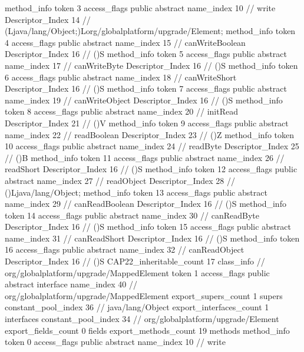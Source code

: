 {{{{{				}
				method_info {
					token	3
					access_flags	public abstract
					name_index	10		// write
					Descriptor_Index	14		// (Ljava/lang/Object;)Lorg/globalplatform/upgrade/Element;
				}
				method_info {
					token	4
					access_flags	public abstract
					name_index	15		// canWriteBoolean
					Descriptor_Index	16		// ()S
				}
				method_info {
					token	5
					access_flags	public abstract
					name_index	17		// canWriteByte
					Descriptor_Index	16		// ()S
				}
				method_info {
					token	6
					access_flags	public abstract
					name_index	18		// canWriteShort
					Descriptor_Index	16		// ()S
				}
				method_info {
					token	7
					access_flags	public abstract
					name_index	19		// canWriteObject
					Descriptor_Index	16		// ()S
				}
				method_info {
					token	8
					access_flags	public abstract
					name_index	20		// initRead
					Descriptor_Index	21		// ()V
				}
				method_info {
					token	9
					access_flags	public abstract
					name_index	22		// readBoolean
					Descriptor_Index	23		// ()Z
				}
				method_info {
					token	10
					access_flags	public abstract
					name_index	24		// readByte
					Descriptor_Index	25		// ()B
				}
				method_info {
					token	11
					access_flags	public abstract
					name_index	26		// readShort
					Descriptor_Index	16		// ()S
				}
				method_info {
					token	12
					access_flags	public abstract
					name_index	27		// readObject
					Descriptor_Index	28		// ()Ljava/lang/Object;
				}
				method_info {
					token	13
					access_flags	public abstract
					name_index	29		// canReadBoolean
					Descriptor_Index	16		// ()S
				}
				method_info {
					token	14
					access_flags	public abstract
					name_index	30		// canReadByte
					Descriptor_Index	16		// ()S
				}
				method_info {
					token	15
					access_flags	public abstract
					name_index	31		// canReadShort
					Descriptor_Index	16		// ()S
				}
				method_info {
					token	16
					access_flags	public abstract
					name_index	32		// canReadObject
					Descriptor_Index	16		// ()S
				}
			}
			CAP22_inheritable_count	17
		}
		class_info {		// org/globalplatform/upgrade/MappedElement
			token	1
			access_flags	public abstract interface
			name_index	40		// org/globalplatform/upgrade/MappedElement
			export_supers_count	1
			supers {
				constant_pool_index	36		// java/lang/Object
			}
			export_interfaces_count	1
			interfaces {
				constant_pool_index	34		// org/globalplatform/upgrade/Element
			}
			export_fields_count	0
			fields {
			}
			export_methods_count	19
			methods {
				method_info {
					token	0
					access_flags	public abstract
					name_index	10		// write
}}}}}
